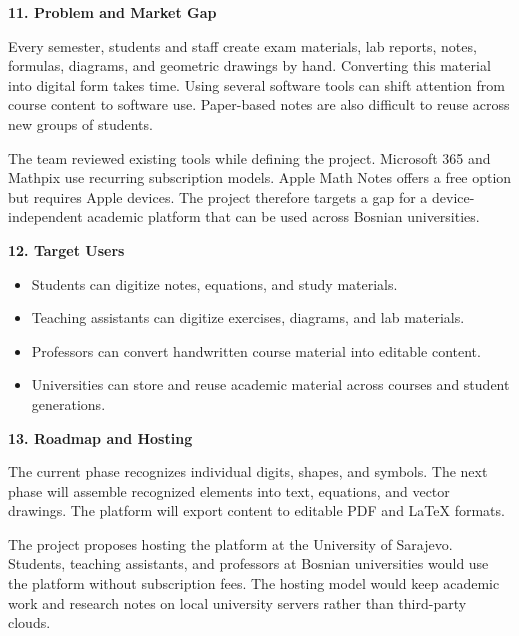 \documentclass[9pt,a4paper]{extarticle}
\newcommand{\Sec}[1]{\vspace{2pt}\noindent\textbf{#1}\par\vspace{2pt}}
\begin{document}
\Sec{11. Problem and Market Gap}
Every semester, students and staff create exam materials, lab reports, notes, formulas, diagrams, and geometric drawings by hand. Converting this material into digital form takes time. Using several software tools can shift attention from course content to software use. Paper-based notes are also difficult to reuse across new groups of students.

The team reviewed existing tools while defining the project. Microsoft 365 and Mathpix use recurring subscription models. Apple Math Notes offers a free option but requires Apple devices. The project therefore targets a gap for a device-independent academic platform that can be used across Bosnian universities.

\Sec{12. Target Users}
\begin{itemize}
\item Students can digitize notes, equations, and study materials.
\item Teaching assistants can digitize exercises, diagrams, and lab materials.
\item Professors can convert handwritten course material into editable content.
\item Universities can store and reuse academic material across courses and student generations.
\end{itemize}

\Sec{13. Roadmap and Hosting}
The current phase recognizes individual digits, shapes, and symbols. The next phase will assemble recognized elements into text, equations, and vector drawings. The platform will export content to editable PDF and LaTeX formats.

The project proposes hosting the platform at the University of Sarajevo. Students, teaching assistants, and professors at Bosnian universities would use the platform without subscription fees. The hosting model would keep academic work and research notes on local university servers rather than third-party clouds.
\end{document}
